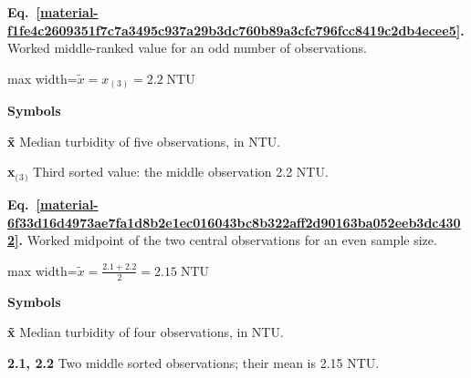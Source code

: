 \documentclass[11pt,a4paper]{article}
\begin{document}
\par\medskip
\noindent\begin{minipage}{\linewidth}
\label{material-f1fe4c2609351f7c7a3495c937a29b3dc760b89a3cfc796fcc8419c2db4ecee5}
\noindent\textbf{Eq.~\ref*{material-f1fe4c2609351f7c7a3495c937a29b3dc760b89a3cfc796fcc8419c2db4ecee5}.} Worked middle-ranked value for an odd number of observations.\par\nopagebreak
\begin{center}\begin{adjustbox}{max width=\linewidth}$\displaystyle \tilde{x}=x_{(3)}=2.2\;\mathrm{NTU}$\end{adjustbox}\end{center}

\par\noindent\textbf{Symbols}

\par\noindent\textbf{x̃} Median turbidity of five observations, in NTU.

\par\noindent\textbf{x\ensuremath{{}_{(}}\ensuremath{{}_3}\ensuremath{{}_{)}}} Third sorted value: the middle observation 2.2 NTU.

\end{minipage}\par
\medskip

\par\medskip
\noindent\begin{minipage}{\linewidth}
\label{material-6f33d16d4973ae7fa1d8b2e1ec016043bc8b322aff2d90163ba052eeb3dc4302}
\noindent\textbf{Eq.~\ref*{material-6f33d16d4973ae7fa1d8b2e1ec016043bc8b322aff2d90163ba052eeb3dc4302}.} Worked midpoint of the two central observations for an even sample size.\par\nopagebreak
\begin{center}\begin{adjustbox}{max width=\linewidth}$\displaystyle \tilde{x}=\frac{2.1+2.2}{2}=2.15\;\mathrm{NTU}$\end{adjustbox}\end{center}

\par\noindent\textbf{Symbols}

\par\noindent\textbf{x̃} Median turbidity of four observations, in NTU.

\par\noindent\textbf{2.1, 2.2} Two middle sorted observations; their mean is 2.15 NTU.

\end{minipage}\par
\medskip
\end{document}
